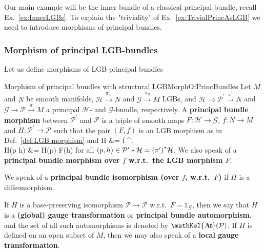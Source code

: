\documentclass[a4paper,oneside,11pt,bibliography=totoc]{scrartcl}
\DeclareMathOperator{\sAut}{\mathKel{A\mkern-5.5mu u\mkern-4mu t\mkern-1.5mu}}
\def\ba#1\ea{\begin{align}#1\end{align}}
\theoremstyle{plain}
\theoremstyle{remark}
\theoremstyle{definition}
\begin{document}
Our main example will be the inner bundle of a classical principal bundle, recall Ex.\ \ref{ex:InnerLGBs}. To explain the "triviality" of Ex.\ \ref{ex:TrivialPrincAsLGB} we need to introduce morphisms of principal bundles.

\subsubsection{Morphism of principal LGB-bundles}

Let us define morphisms of LGB-principal bundles

\begin{definitions}{Morphism of principal bundles with structural LGB}{MorphOfPrincBundles}
Let $M$ and $N$ be smooth manifolds, $\mathcal{H} \stackrel{\pi_{\mathcal{H}}}{\to} N$ and $\mathcal{G} \stackrel{\pi_{\mathcal{G}}}{\to} M$ LGBs, and $\mathcal{H} \to \mathcal{P}^\prime \stackrel{\pi^\prime}{\to} N$ and $\mathcal{G} \to \mathcal{P} \stackrel{\pi}{\to} M$ a principal $\mathcal{H}$- and $\mathcal{G}$-bundle, respectively. A \textbf{principal bundle morphism} between $\mathcal{P}^\prime$ and $\mathcal{P}$ is a triple of smooth maps $F: \mathcal{H} \to \mathcal{G}$, $f: N \to M$ and $H: \mathcal{P}^\prime \to \mathcal{P}$ such that the pair $(F, f)$ is an LGB morphism as in Def.\ \ref{def:LGB morphism} and
\ba
\pi \circ H &= f \circ \pi^\prime,\label{PrincMorphoverBaseMap}\\
H(p \cdot h) &= H(p) \cdot F(h)\label{PrincMorphLGBEquiv}
\ea
for all $(p, h) \in \mathcal{P}^\prime * \mathcal{H} = \mleft(\pi^\prime\mright)^*\mathcal{H}$. We also speak of a \textbf{principal bundle morphism over $f$ w.r.t.\ the LGB morphism $F$}.

We speak of a \textbf{principal bundle isomorphism (over $f$, w.r.t.\ $F$)} if $H$ is a diffeomorphism. 

If $H$ is a base-preserving isomorphism $\mathcal{P} \to \mathcal{P}$ w.r.t.\ $F = \mathds{1}_{\mathcal{G}}$, then we say that $H$ is a \textbf{(global) gauge transformation} or \textbf{principal bundle automorphism}, and the set of all such automorphisms is denoted by $\sAut(\mathcal{P})$. If $H$ is defined on an open subset of $M$, then we may also speak of a \textbf{local gauge transformation}.
\end{definitions}
\end{document}
